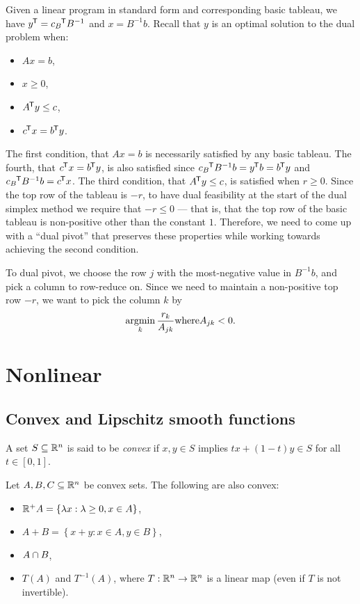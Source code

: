 Given a linear program in standard form and corresponding basic tableau, we have ${y}^{\mkern-1.5mu\mathsf{T}} = {c_B}^{\mkern-1.5mu\mathsf{T}}B^{-1}$ and $x = B^{-1}b$. Recall that $y$ is an optimal solution to the dual problem when:
\begin{itemize}
    \item $Ax = b$,
    \item $x \geq 0$,
    \item ${A}^{\mkern-1.5mu\mathsf{T}}y \leq c$,
    \item ${c}^{\mkern-1.5mu\mathsf{T}}x = {b}^{\mkern-1.5mu\mathsf{T}}y$.
\end{itemize}

The first condition, that $Ax = b$ is necessarily satisfied by any basic tableau. The fourth, that ${c}^{\mkern-1.5mu\mathsf{T}}x = {b}^{\mkern-1.5mu\mathsf{T}}y$, is also satisfied since ${c_B}^{\mkern-1.5mu\mathsf{T}}B^{-1}b = {y}^{\mkern-1.5mu\mathsf{T}}b = {b}^{\mkern-1.5mu\mathsf{T}}y$ and ${c_B}^{\mkern-1.5mu\mathsf{T}}B^{-1}b = {c}^{\mkern-1.5mu\mathsf{T}}x$. The third condition, that ${A}^{\mkern-1.5mu\mathsf{T}}y \leq c$, is satisfied when $r \geq 0$. Since the top row of the tableau is $-r$, to have dual feasibility at the start of the dual simplex method we require that $-r \leq 0$ --- that is, that the top row of the basic tableau is non-positive other than the constant $1$. Therefore, we need to come up with a ``dual pivot'' that preserves these properties while working towards achieving the second condition.

To dual pivot, we choose the row $j$ with the most-negative value in $B^{-1}b$, and pick a column to row-reduce on. Since we need to maintain a non-positive top row $-r$, we want to pick the column $k$ by \[\operatorname*{argmin}_{k}\frac{r_k}{A_{jk}} \mathrm{ where } A_{jk} < 0.\]

\section{Nonlinear}

\subsection{Convex and Lipschitz smooth functions}

\begin{defn}
    A set $S \subseteq \mathbb{R}^n$ is said to be \emph{convex} if $x, y \in S$ implies $tx + (1-t)y \in S$ for all $t \in [0, 1]$.
\end{defn}

\begin{lemma}\label{lemma:convex-sets}
    Let $A, B, C \subseteq \mathbb{R}^n$ be convex sets. The following are also convex:
    \begin{itemize}
        \item $\mathbb{R}^{+}A = \left\{\lambda x : \lambda \geq 0, x \in A\right\}$,
        \item $A + B = \left\{x + y : x \in A, y \in B\right\}$,
        \item $A \cap B$,
        \item $T(A)$ and $T^{-1}(A)$, where $T: \mathbb{R}^n \to \mathbb{R}^n$ is a linear map (even if $T$ is not invertible).
    \end{itemize}
\end{lemma}

